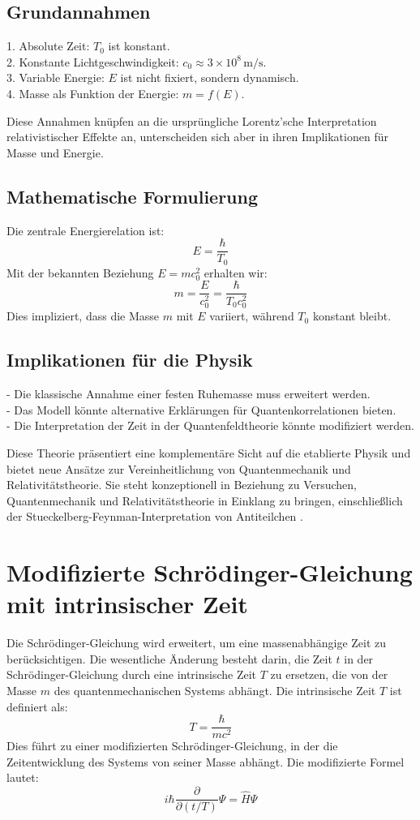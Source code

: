 \documentclass[a4paper,12pt]{article}
\newcommand{\Tzero}{T_0}
\begin{document}
	\subsection{Grundannahmen}
	1. Absolute Zeit: $\Tzero$ ist konstant. \\
	2. Konstante Lichtgeschwindigkeit: $c_0 \approx 3 \times 10^8 \, \text{m/s}$. \\
	3. Variable Energie: $E$ ist nicht fixiert, sondern dynamisch. \\
	4. Masse als Funktion der Energie: $m = f(E)$.
	
	Diese Annahmen knüpfen an die ursprüngliche Lorentz'sche Interpretation relativistischer Effekte \cite{Lorentz1904} an, unterscheiden sich aber in ihren Implikationen für Masse und Energie.
	
	\subsection{Mathematische Formulierung}
	Die zentrale Energierelation ist:
	\[
	E = \frac{\hbar}{\Tzero}
	\]
	Mit der bekannten Beziehung $E = m c_0^2$ erhalten wir:
	\[
	m = \frac{E}{c_0^2} = \frac{\hbar}{\Tzero c_0^2}
	\]
	Dies impliziert, dass die Masse $m$ mit $E$ variiert, während $\Tzero$ konstant bleibt.
	
	\subsection{Implikationen für die Physik}
	- Die klassische Annahme einer festen Ruhemasse muss erweitert werden. \\
	- Das Modell könnte alternative Erklärungen für Quantenkorrelationen bieten. \\
	- Die Interpretation der Zeit in der Quantenfeldtheorie könnte modifiziert werden.
	
	Diese Theorie präsentiert eine komplementäre Sicht auf die etablierte Physik und bietet neue Ansätze zur Vereinheitlichung von Quantenmechanik und Relativitätstheorie. Sie steht konzeptionell in Beziehung zu Versuchen, Quantenmechanik und Relativitätstheorie in Einklang zu bringen, einschließlich der Stueckelberg-Feynman-Interpretation von Antiteilchen \cite{Stueckelberg1941, Feynman1949}.
	
	\section{Modifizierte Schrödinger-Gleichung mit intrinsischer Zeit}
	Die Schrödinger-Gleichung wird erweitert, um eine massenabhängige Zeit zu berücksichtigen. Die wesentliche Änderung besteht darin, die Zeit $t$ in der Schrödinger-Gleichung durch eine intrinsische Zeit $T$ zu ersetzen, die von der Masse $m$ des quantenmechanischen Systems abhängt. Die intrinsische Zeit $T$ ist definiert als:
	\[
	T = \frac{\hbar}{m c^2}
	\]
	Dies führt zu einer modifizierten Schrödinger-Gleichung, in der die Zeitentwicklung des Systems von seiner Masse abhängt. Die modifizierte Formel lautet:
	\[
	i\hbar \frac{\partial}{\partial (t/T)} \Psi = \hat{H} \Psi
	\]
	
\end{document}
